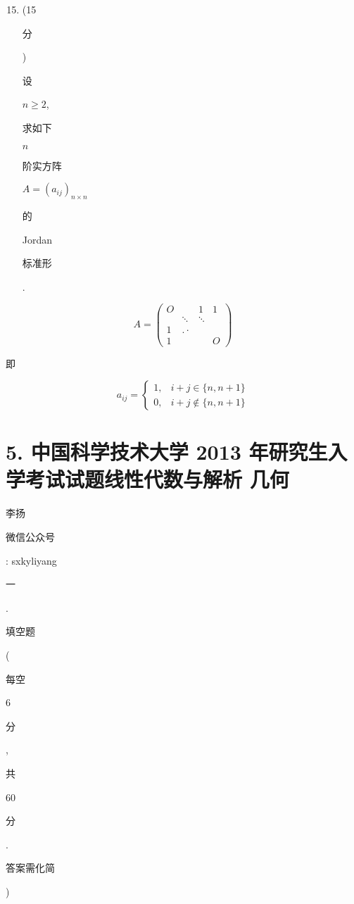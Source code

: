 \documentclass[10pt]{article}
\begin{document}
\begin{enumerate}
  \setcounter{enumi}{14}
  \item (15 \begin{CJK}{UTF8}{mj}分\end{CJK}) \begin{CJK}{UTF8}{mj}设\end{CJK} $n \geqslant 2$, \begin{CJK}{UTF8}{mj}求如下\end{CJK} $n$ \begin{CJK}{UTF8}{mj}阶实方阵\end{CJK} $A=\left(a_{i j}\right)_{n \times n}$ \begin{CJK}{UTF8}{mj}的\end{CJK} Jordan \begin{CJK}{UTF8}{mj}标准形\end{CJK}.
\end{enumerate}
$$
A=\left(\begin{array}{cccc}
O & & 1 & 1 \\
& \ddots & \ddots & \\
1 & . \cdot & & \\
1 & & & O
\end{array}\right)
$$
\begin{CJK}{UTF8}{mj}即\end{CJK}
$$
a_{i j}= \begin{cases}1, & i+j \in\{n, n+1\} \\ 0, & i+j \notin\{n, n+1\}\end{cases}
$$

\section{5. 中国科学技术大学 2013 年研究生入学考试试题线性代数与解析 几何}
\begin{CJK}{UTF8}{mj}李扬\end{CJK}

\begin{CJK}{UTF8}{mj}微信公众号\end{CJK}: sxkyliyang

\begin{CJK}{UTF8}{mj}一\end{CJK}. \begin{CJK}{UTF8}{mj}填空题\end{CJK}(\begin{CJK}{UTF8}{mj}每空\end{CJK} 6 \begin{CJK}{UTF8}{mj}分\end{CJK}, \begin{CJK}{UTF8}{mj}共\end{CJK} 60 \begin{CJK}{UTF8}{mj}分\end{CJK}. \begin{CJK}{UTF8}{mj}答案需化简\end{CJK})
\end{document}
